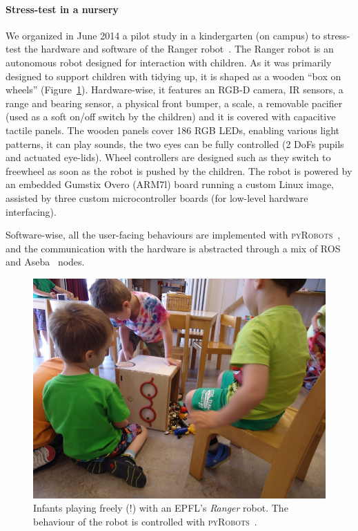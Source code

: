 \documentclass[a4paper, 10pt, conference]{ieeeconf}      %
\newcommand{\pyRobots}{\textsc{pyRobots}\ }
\begin{document}
\paragraph{Stress-test in a nursery}
\label{croq}

We organized in June 2014 a pilot study in a kindergarten (on campus) to
stress-test the hardware and software of the Ranger
robot~\cite{mondada2014ranger}. The Ranger robot is an autonomous robot designed
for interaction with children. As it was primarily designed to support children
with tidying up, it is shaped as a wooden ``box on wheels''
(Figure~\ref{expe-nursery}). Hardware-wise, it features an RGB-D camera, IR
sensors, a range and bearing sensor, a physical front bumper, a scale, a
removable pacifier (used as a soft on/off switch by the children) and it is
covered with capacitive tactile panels. The wooden panels cover 186 RGB LEDs,
enabling various light patterns, it can play sounds, the two eyes can be fully
controlled (2 DoFs pupils and actuated eye-lids). Wheel controllers are designed
such as they switch to freewheel as soon as the robot is pushed by the children.
The robot is powered by an embedded Gumstix Overo (ARM7l) board running a custom
Linux image, assisted by three custom microcontroller boards (for low-level
hardware interfacing).

Software-wise, all the user-facing behaviours are implemented with \pyRobots,
and the communication with the hardware is abstracted through a mix of ROS
and Aseba~\cite{magnenat2011aseba} nodes.

\begin{figure}
        \centering
        \includegraphics[width=0.9\columnwidth]{ranger-side}
        \caption{Infants playing freely (!) with an EPFL's \emph{Ranger} robot.
        The behaviour of the robot is controlled with \pyRobots.}
        \label{expe-nursery}
\end{figure}
\end{document}
